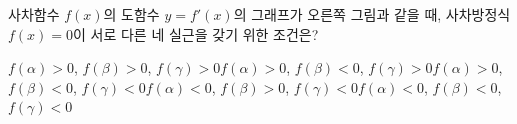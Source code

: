 \noindent\begin{minipage}[t]{0.58\linewidth}\vspace{0pt}\raggedright 사차함수 $f(x)$의 도함수 $y=f'(x)$의 그래프가 오른쪽 그림과 같을 때, 사차방정식 $f(x)=0$이 서로 다른 네 실근을 갖기 위한 조건은? \dmcondfill{$\alpha<\beta<\gamma$}{}\end{minipage}\hfill\begin{minipage}[t]{0.4\linewidth}\vspace{0pt}\centering \resizebox{\ifdim\width>\linewidth\linewidth\else\width\fi}{!}{}\end{minipage}\par
\begin{choicesv}{$f(\alpha)>0$, $f(\beta)>0$, $f(\gamma)>0$}{$f(\alpha)>0$, $f(\beta)<0$, $f(\gamma)>0$}{$f(\alpha)>0$, $f(\beta)<0$, $f(\gamma)<0$}{$f(\alpha)<0$, $f(\beta)>0$, $f(\gamma)<0$}{$f(\alpha)<0$, $f(\beta)<0$, $f(\gamma)<0$}\end{choicesv}
